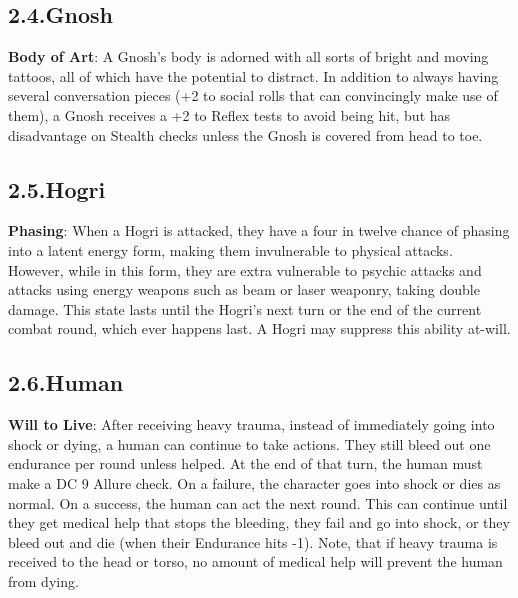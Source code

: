 \documentclass{article}
\begin{document}
\subsection{2.4.\hspace*{0.5em}Gnosh}\label{sec-gnosh}%

\noindent{}\textbf{Body of Art}: A Gnosh’s body is adorned with all sorts of bright and moving tattoos, all of which have the potential to distract. In addition to always having several conversation pieces (+2 to social rolls that can convincingly make use of them), a Gnosh receives a +2 to Reflex tests to avoid being hit, but has disadvantage on Stealth checks unless the Gnosh is covered from head to toe.%

\subsection{2.5.\hspace*{0.5em}Hogri}\label{sec-hogri}%

\noindent{}\textbf{Phasing}: When a Hogri is attacked, they have a four in twelve chance of phasing into a latent energy form, making them invulnerable to physical attacks. However, while in this form, they are extra vulnerable to psychic attacks and attacks using energy weapons such as beam or laser weaponry, taking double damage. This state lasts until the Hogri's next turn or the end of the current combat round, which ever happens last. A Hogri may suppress this ability at-will.%

\subsection{2.6.\hspace*{0.5em}Human}\label{sec-human}%

\noindent{}\textbf{Will to Live}:  After receiving heavy trauma, instead of immediately going into shock or dying, a human can continue to take actions. They still bleed out one endurance per round unless helped. At the end of that turn, the human must make a DC 9 Allure check. On a failure, the character goes into shock or dies as normal. On a success, the human can act the next round. This can continue until they get medical help that stops the bleeding, they fail and go into shock, or they bleed out and die (when their Endurance hits -1). Note, that if heavy trauma is received to the head or torso, no amount of medical help will prevent the human from dying.%
\end{document}
